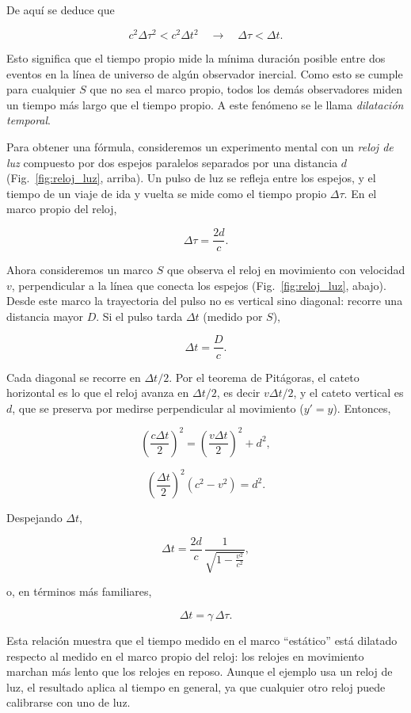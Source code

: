 De aquí se deduce que

$$
c^2\Delta\tau^2 < c^2\Delta t^2 \quad\longrightarrow\quad \Delta\tau < \Delta t .
$$

Esto significa que el tiempo propio mide la mínima duración posible entre dos eventos en la línea de universo de algún observador inercial. Como esto se cumple para cualquier $S$ que no sea el marco propio, todos los demás observadores miden un tiempo más largo que el tiempo propio. A este fenómeno se le llama \emph{dilatación temporal}.

Para obtener una fórmula, consideremos un experimento mental con un \emph{reloj de luz} compuesto por dos espejos paralelos separados por una distancia $d$ (Fig.~\ref{fig:reloj_luz}, arriba). Un pulso de luz se refleja entre los espejos, y el tiempo de un viaje de ida y vuelta se mide como el tiempo propio $\Delta\tau$. En el marco propio del reloj,

$$
\Delta\tau = \frac{2d}{c}.
$$

Ahora consideremos un marco $S$ que observa el reloj en movimiento con velocidad $v$, perpendicular a la línea que conecta los espejos (Fig.~\ref{fig:reloj_luz}, abajo). Desde este marco la trayectoria del pulso no es vertical sino diagonal: recorre una distancia mayor $D$. Si el pulso tarda $\Delta t$ (medido por $S$),

$$
\Delta t = \frac{D}{c}.
$$

Cada diagonal se recorre en $\Delta t/2$. Por el teorema de Pitágoras, el cateto horizontal es lo que el reloj avanza en $\Delta t/2$, es decir $v\Delta t/2$, y el cateto vertical es $d$, que se preserva por medirse perpendicular al movimiento ($y'=y$). Entonces,

$$
\left(\frac{c\Delta t}{2}\right)^2 = \left(\frac{v\Delta t}{2}\right)^2 + d^2 ,
$$

$$
\left(\frac{\Delta t}{2}\right)^2\left(c^2 - v^2\right) = d^2 .
$$

Despejando $\Delta t$,

$$
\Delta t = \frac{2d}{c}\,\frac{1}{\sqrt{1-\frac{v^2}{c^2}}} ,
$$

o, en términos más familiares,

$$
\Delta t = \gamma\,\Delta\tau .
$$

Esta relación muestra que el tiempo medido en el marco ``estático'' está dilatado respecto al medido en el marco propio del reloj: los relojes en movimiento marchan más lento que los relojes en reposo. Aunque el ejemplo usa un reloj de luz, el resultado aplica al tiempo en general, ya que cualquier otro reloj puede calibrarse con uno de luz.

